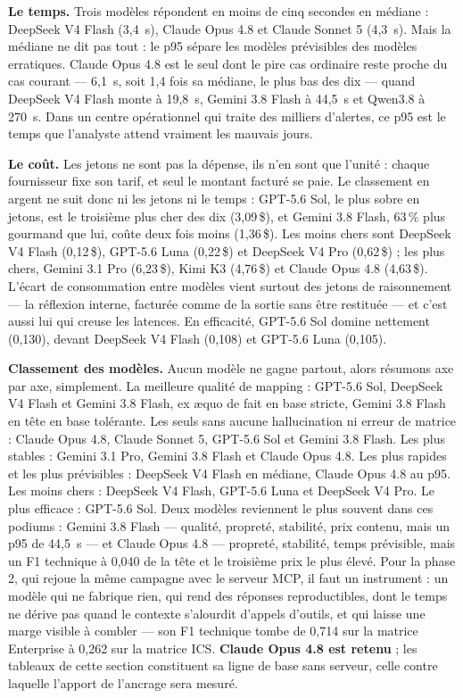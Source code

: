\textbf{Le temps.} Trois modèles répondent en moins de cinq secondes en médiane : DeepSeek V4 Flash (3,4~s), Claude Opus 4.8 et Claude Sonnet 5 (4,3~s). Mais la médiane ne dit pas tout : le p95 sépare les modèles prévisibles des modèles erratiques. Claude Opus 4.8 est le seul dont le pire cas ordinaire reste proche du cas courant --- 6,1~s, soit 1,4 fois sa médiane, le plus bas des dix --- quand DeepSeek V4 Flash monte à 19,8~s, Gemini 3.8 Flash à 44,5~s et Qwen3.8 à 270~s. Dans un centre opérationnel qui traite des milliers d'alertes, ce p95 est le temps que l'analyste attend vraiment les mauvais jours.

\textbf{Le coût.} Les jetons ne sont pas la dépense, ils n'en sont que l'unité : chaque fournisseur fixe son tarif, et seul le montant facturé se paie. Le classement en argent ne suit donc ni les jetons ni le temps : GPT-5.6 Sol, le plus sobre en jetons, est le troisième plus cher des dix (3,09\,\$), et Gemini 3.8 Flash, 63\,\% plus gourmand que lui, coûte deux fois moins (1,36\,\$). Les moins chers sont DeepSeek V4 Flash (0,12\,\$), GPT-5.6 Luna (0,22\,\$) et DeepSeek V4 Pro (0,62\,\$) ; les plus chers, Gemini 3.1 Pro (6,23\,\$), Kimi K3 (4,76\,\$) et Claude Opus 4.8 (4,63\,\$). L'écart de consommation entre modèles vient surtout des jetons de raisonnement --- la réflexion interne, facturée comme de la sortie sans être restituée --- et c'est aussi lui qui creuse les latences. En efficacité, GPT-5.6 Sol domine nettement (0,130), devant DeepSeek V4 Flash (0,108) et GPT-5.6 Luna (0,105).

\textbf{Classement des modèles.} Aucun modèle ne gagne partout, alors résumons axe par axe, simplement. La meilleure qualité de mapping : GPT-5.6 Sol, DeepSeek V4 Flash et Gemini 3.8 Flash, ex æquo de fait en base stricte, Gemini 3.8 Flash en tête en base tolérante. Les seuls sans aucune hallucination ni erreur de matrice : Claude Opus 4.8, Claude Sonnet 5, GPT-5.6 Sol et Gemini 3.8 Flash. Les plus stables : Gemini 3.1 Pro, Gemini 3.8 Flash et Claude Opus 4.8. Les plus rapides et les plus prévisibles : DeepSeek V4 Flash en médiane, Claude Opus 4.8 au p95. Les moins chers : DeepSeek V4 Flash, GPT-5.6 Luna et DeepSeek V4 Pro. Le plus efficace : GPT-5.6 Sol. Deux modèles reviennent le plus souvent dans ces podiums : Gemini 3.8 Flash --- qualité, propreté, stabilité, prix contenu, mais un p95 de 44,5~s --- et Claude Opus 4.8 --- propreté, stabilité, temps prévisible, mais un F1 technique à 0,040 de la tête et le troisième prix le plus élevé. Pour la phase 2, qui rejoue la même campagne avec le serveur MCP, il faut un instrument : un modèle qui ne fabrique rien, qui rend des réponses reproductibles, dont le temps ne dérive pas quand le contexte s'alourdit d'appels d'outils, et qui laisse une marge visible à combler --- son F1 technique tombe de 0,714 sur la matrice Enterprise à 0,262 sur la matrice ICS. \textbf{Claude Opus 4.8 est retenu} ; les tableaux de cette section constituent sa ligne de base sans serveur, celle contre laquelle l'apport de l'ancrage sera mesuré.

